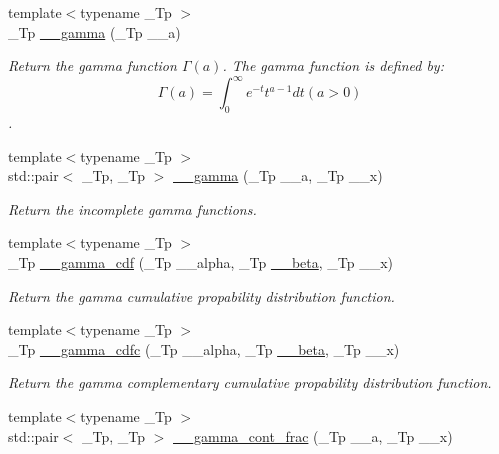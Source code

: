 \begin{DoxyCompactItemize}
{\footnotesize template$<$typename \+\_\+\+Tp $>$ }\\\+\_\+\+Tp \hyperlink{namespacestd_1_1____detail_a178e0b2cc0ae66b7d958e837da4fe4c1}{\+\_\+\+\_\+gamma} (\+\_\+\+Tp \+\_\+\+\_\+a)
\begin{DoxyCompactList}\small\item\em Return the gamma function $ \Gamma(a) $. The gamma function is defined by\+: \[ \Gamma(a) = \int_0^\infty e^{-t}t^{a-1}dt (a > 0) \]. \end{DoxyCompactList}\item 
{\footnotesize template$<$typename \+\_\+\+Tp $>$ }\\std\+::pair$<$ \+\_\+\+Tp, \+\_\+\+Tp $>$ \hyperlink{namespacestd_1_1____detail_a00ade496acee116fb7990d20ff4be762}{\+\_\+\+\_\+gamma} (\+\_\+\+Tp \+\_\+\+\_\+a, \+\_\+\+Tp \+\_\+\+\_\+x)
\begin{DoxyCompactList}\small\item\em Return the incomplete gamma functions. \end{DoxyCompactList}\item 
{\footnotesize template$<$typename \+\_\+\+Tp $>$ }\\\+\_\+\+Tp \hyperlink{namespacestd_1_1____detail_aa4f1cd082a56f66b7ac2f8d805f66a81}{\+\_\+\+\_\+gamma\+\_\+cdf} (\+\_\+\+Tp \+\_\+\+\_\+alpha, \+\_\+\+Tp \hyperlink{namespacestd_1_1____detail_a090d2f0920e0d208c467609b2a81d717}{\+\_\+\+\_\+beta}, \+\_\+\+Tp \+\_\+\+\_\+x)
\begin{DoxyCompactList}\small\item\em Return the gamma cumulative propability distribution function. \end{DoxyCompactList}\item 
{\footnotesize template$<$typename \+\_\+\+Tp $>$ }\\\+\_\+\+Tp \hyperlink{namespacestd_1_1____detail_a7dc59114c8c223b5570c374a7192d404}{\+\_\+\+\_\+gamma\+\_\+cdfc} (\+\_\+\+Tp \+\_\+\+\_\+alpha, \+\_\+\+Tp \hyperlink{namespacestd_1_1____detail_a090d2f0920e0d208c467609b2a81d717}{\+\_\+\+\_\+beta}, \+\_\+\+Tp \+\_\+\+\_\+x)
\begin{DoxyCompactList}\small\item\em Return the gamma complementary cumulative propability distribution function. \end{DoxyCompactList}\item 
{\footnotesize template$<$typename \+\_\+\+Tp $>$ }\\std\+::pair$<$ \+\_\+\+Tp, \+\_\+\+Tp $>$ \hyperlink{namespacestd_1_1____detail_afd6319747af991947a02388acee40c26}{\+\_\+\+\_\+gamma\+\_\+cont\+\_\+frac} (\+\_\+\+Tp \+\_\+\+\_\+a, \+\_\+\+Tp \+\_\+\+\_\+x)

\end{DoxyCompactItemize}
